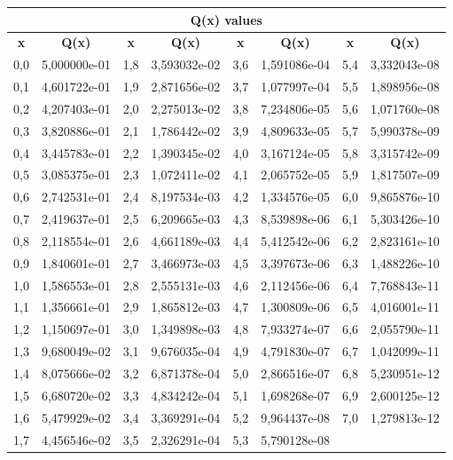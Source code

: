 \documentclass[en]{article}
\begin{document}
\begin{center}
\begin{tabular}{|c|c|c|}
        \end{tabular}
        \renewcommand{\arraystretch}{1}
        \vspace{0.5cm}



    \begin{tabular}{cc|cc|cc|cc}
        \multicolumn{8}{c}{{\bf Q(x) values}} \\
        \hline
        {\bf x} & {\bf Q(x)} & {\bf x} & {\bf Q(x)} & {\bf x} & {\bf Q(x)} & {\bf x} & {\bf Q(x)} \\
        \hline
        0,0 & 5,000000e-01 & 1,8 & 3,593032e-02 & 3,6 & 1,591086e-04 & 5,4 & 3,332043e-08 \\
        0,1 & 4,601722e-01 & 1,9 & 2,871656e-02 & 3,7 & 1,077997e-04 & 5,5 & 1,898956e-08 \\
        0,2 & 4,207403e-01 & 2,0 & 2,275013e-02 & 3,8 & 7,234806e-05 & 5,6 & 1,071760e-08 \\
        0,3 & 3,820886e-01 & 2,1 & 1,786442e-02 & 3,9 & 4,809633e-05 & 5,7 & 5,990378e-09 \\
        0,4 & 3,445783e-01 & 2,2 & 1,390345e-02 & 4,0 & 3,167124e-05 & 5,8 & 3,315742e-09 \\
        0,5 & 3,085375e-01 & 2,3 & 1,072411e-02 & 4,1 & 2,065752e-05 & 5,9 & 1,817507e-09 \\
        0,6 & 2,742531e-01 & 2,4 & 8,197534e-03 & 4,2 & 1,334576e-05 & 6,0 & 9,865876e-10 \\
        0,7 & 2,419637e-01 & 2,5 & 6,209665e-03 & 4,3 & 8,539898e-06 & 6,1 & 5,303426e-10 \\
        0,8 & 2,118554e-01 & 2,6 & 4,661189e-03 & 4,4 & 5,412542e-06 & 6,2 & 2,823161e-10 \\
        0,9 & 1,840601e-01 & 2,7 & 3,466973e-03 & 4,5 & 3,397673e-06 & 6,3 & 1,488226e-10 \\
        1,0 & 1,586553e-01 & 2,8 & 2,555131e-03 & 4,6 & 2,112456e-06 & 6,4 & 7,768843e-11 \\
        1,1 & 1,356661e-01 & 2,9 & 1,865812e-03 & 4,7 & 1,300809e-06 & 6,5 & 4,016001e-11 \\
        1,2 & 1,150697e-01 & 3,0 & 1,349898e-03 & 4,8 & 7,933274e-07 & 6,6 & 2,055790e-11 \\
        1,3 & 9,680049e-02 & 3,1 & 9,676035e-04 & 4,9 & 4,791830e-07 & 6,7 & 1,042099e-11 \\
        1,4 & 8,075666e-02 & 3,2 & 6,871378e-04 & 5,0 & 2,866516e-07 & 6,8 & 5,230951e-12 \\
        1,5 & 6,680720e-02 & 3,3 & 4,834242e-04 & 5,1 & 1,698268e-07 & 6,9 & 2,600125e-12 \\
        1,6 & 5,479929e-02 & 3,4 & 3,369291e-04 & 5,2 & 9,964437e-08 & 7,0 & 1,279813e-12 \\
        1,7 & 4,456546e-02 & 3,5 & 2,326291e-04 & 5,3 & 5,790128e-08 & \\                 
    \end{tabular}
    \renewcommand{\arraystretch}{1}
    \vspace{0.5cm}

\end{center}
\end{document}
